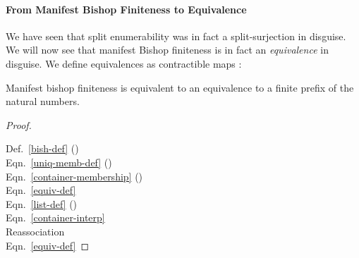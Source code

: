 \paragraph{From Manifest Bishop Finiteness to Equivalence}
We have seen that split enumerability was in fact a split-surjection in
disguise.
We will now see that manifest Bishop finiteness is in fact an \emph{equivalence}
in disguise.
We define equivalences as contractible maps \cite[definition 4.4.1]{hottbook}:
    \begin{multicols}{2}
       \columnbreak
    \end{multicols}
\begin{lemma}\label{bishop-equiv}
  Manifest bishop finiteness is equivalent to an equivalence to a finite prefix
  of the natural numbers.
  
  
\end{lemma}
\begin{proof} \let\qed\relax \vspace{-1\baselineskip}\phantom{Proof.} \\
  \begin{minipage}[t]{.83\textwidth}\vspace{-1.25\baselineskip}
    
    
  \end{minipage}
  \begin{minipage}[t]{.16\textwidth}

    Def.~\ref{bish-def} ()     \\
    Eqn.~\ref{uniq-memb-def} (\AgdaDatatype{\ensuremath{\in!}})       \\
    Eqn.~\ref{container-membership} (\AgdaDatatype{\ensuremath{\in}}) \\
    Eqn.~\ref{equiv-def} \\
    Eqn.~\ref{list-def} ({}) \\
    Eqn.~\ref{container-interp}  \\
    Reassociation \\
    Eqn.~\ref{equiv-def}
  \end{minipage}
\end{proof}

